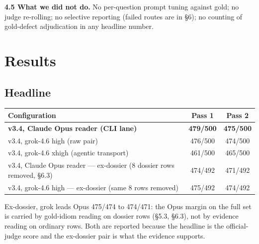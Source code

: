 \documentclass[11pt]{article}
\begin{document}
\textbf{4.5 What we did not do.} No per-question prompt tuning against gold; no
judge re-rolling; no selective reporting (failed routes are in \S6); no
counting of gold-defect adjudication in any headline number.

\section{Results}
\subsection{Headline}
\begin{center}
\begin{tabular}{lcc}
\toprule
Configuration & Pass 1 & Pass 2\\
\midrule
\textbf{v3.4, Claude Opus reader (CLI lane)} & \textbf{479/500} & \textbf{475/500}\\
v3.4, grok-4.6 high (raw pair) & 476/500 & 474/500\\
v3.4, grok-4.6 xhigh (agentic transport) & 461/500 & 465/500\\
v3.4, Claude Opus reader --- ex-dossier (8 dossier rows removed, \S6.3) & 474/492 & 471/492\\
v3.4, grok-4.6 high --- ex-dossier (same 8 rows removed) & 475/492 & 474/492\\
\bottomrule
\end{tabular}
\end{center}

Ex-dossier, grok leads Opus 475/474 to 474/471: the Opus margin on the full
set is carried by gold-idiom reading on dossier rows (\S5.3, \S6.3), not by
evidence reading on ordinary rows. Both are reported because the headline is
the official-judge score and the ex-dossier pair is what the evidence
supports.
\end{document}
